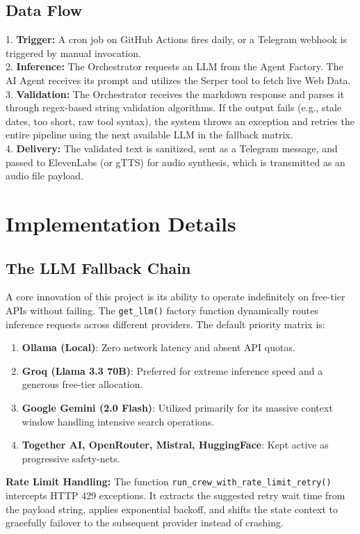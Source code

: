 \documentclass[conference]{IEEEtran}
\begin{document}
\subsection{Data Flow}
1. \textbf{Trigger:} A cron job on GitHub Actions fires daily, or a Telegram webhook is triggered by manual invocation. \\
2. \textbf{Inference:} The Orchestrator requests an LLM from the Agent Factory. The AI Agent receives its prompt and utilizes the Serper tool to fetch live Web Data. \\
3. \textbf{Validation:} The Orchestrator receives the markdown response and parses it through regex-based string validation algorithms. If the output fails (e.g., stale dates, too short, raw tool syntax), the system throws an exception and retries the entire pipeline using the next available LLM in the fallback matrix. \\
4. \textbf{Delivery:} The validated text is sanitized, sent as a Telegram message, and passed to ElevenLabs (or gTTS) for audio synthesis, which is transmitted as an audio file payload.

\section{Implementation Details}

\subsection{The LLM Fallback Chain}
A core innovation of this project is its ability to operate indefinitely on free-tier APIs without failing. The \texttt{get\_llm()} factory function dynamically routes inference requests across different providers. The default priority matrix is:
\begin{enumerate}
    \item \textbf{Ollama (Local)}: Zero network latency and absent API quotas.
    \item \textbf{Groq (Llama 3.3 70B)}: Preferred for extreme inference speed and a generous free-tier allocation.
    \item \textbf{Google Gemini (2.0 Flash)}: Utilized primarily for its massive context window handling intensive search operations.
    \item \textbf{Together AI, OpenRouter, Mistral, HuggingFace}: Kept active as progressive safety-nets.
\end{enumerate}

\textbf{Rate Limit Handling:} The function \texttt{run\_crew\_with\_rate\_limit\_retry()} intercepts HTTP 429 exceptions. It extracts the suggested retry wait time from the payload string, applies exponential backoff, and shifts the state context to gracefully failover to the subsequent provider instead of crashing.
\end{document}
